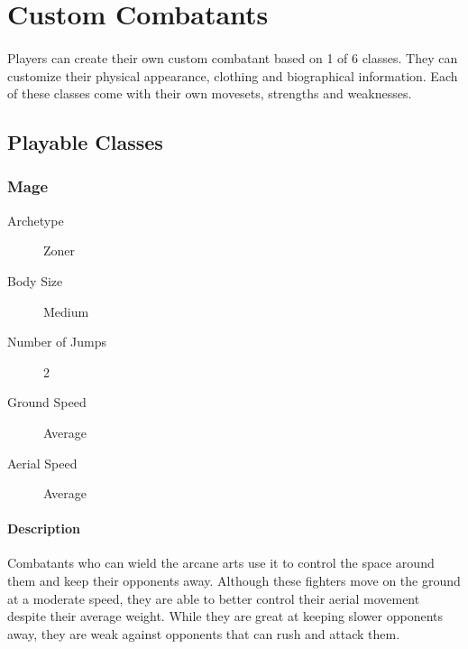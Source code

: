 \pagebreak

\section{Custom Combatants}

\paragraph{} Players can create their own custom combatant based on 1 of 6 classes. They can customize their physical appearance, clothing and biographical information. Each of these classes come with their own movesets, strengths and weaknesses.

\subsection{Playable Classes}

\subsubsection{Mage}

\begin{description}
    \item[Archetype] Zoner
    \item[Body Size] Medium
    \item[Number of Jumps] 2
    \item[Ground Speed] Average
    \item[Aerial Speed] Average    
\end{description}

\paragraph{Description} Combatants who can wield the arcane arts use it to control the space around them and keep their opponents away. Although these fighters move on the ground at a moderate speed, they are able to better control their aerial movement despite their average weight. While they are great at keeping slower opponents away, they are weak against opponents that can rush and attack them.


